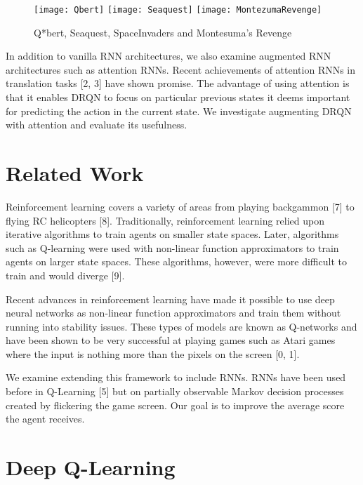 \documentclass{article}
\begin{document}
    \begin{figure}[h]
        \centering
        \begin{minipage}{0.8\textwidth}
            \centering
            \texttt{[image: Qbert]}
            \centering
            \texttt{[image: Seaquest]}
            \centering
            \texttt{[image: MontezumaRevenge]}
        \end{minipage}
        \caption{Q*bert, Seaquest, SpaceInvaders and Montesuma's Revenge}
    \end{figure}


    In addition to vanilla RNN architectures, we also examine augmented RNN
    architectures such as attention RNNs. Recent achievements of attention RNNs in
    translation tasks [2, 3] have shown promise. The advantage of using attention
    is that it enables DRQN to focus on particular previous states it deems
    important for predicting the action in the current state. We investigate
    augmenting DRQN with attention and evaluate its usefulness.

\section{Related Work}

Reinforcement learning covers a variety of areas from playing backgammon [7] to
flying RC helicopters [8]. Traditionally, reinforcement learning relied upon
iterative algorithms to train agents on smaller state spaces. Later, algorithms
such as Q-learning were used with non-linear function approximators to train agents
on larger state spaces. These algorithms, however, were more difficult to train
and would diverge [9].

Recent advances in reinforcement learning have made it possible to use deep
neural networks as non-linear function approximators and train them without
running into stability issues. These types of models are known as Q-networks and
have been shown to be very successful at playing games such as Atari games where
the input is nothing more than the pixels on the screen [0, 1].

We examine extending this framework to include RNNs. RNNs have been used before
in Q-Learning [5] but on partially observable Markov decision processes created
by flickering the game screen. Our goal is to improve the average score the agent
receives.

\section{Deep Q-Learning}
\end{document}
